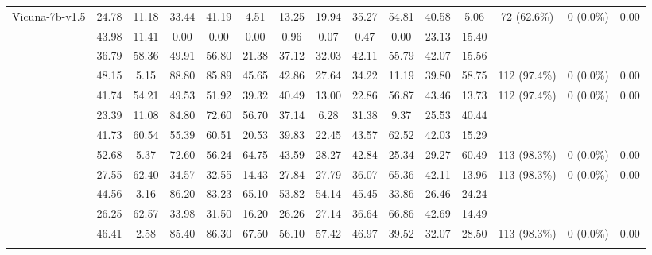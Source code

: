\documentclass[letterpaper]{article} %
\begin{document}
{\begin{table}[t!]
\begin{tabular}{p{2.2cm} ccccccccccc cc c}
\multirow{2}{*}{Vicuna-7b-v1.5} & 24.78 	&	11.18 	&	33.44 	&	41.19 	&	4.51 	&	13.25 	&	19.94 	&	35.27 	&	54.81 	&	40.58 	&	5.06    & \multirow{2}{*}{72 (62.6\%)} & \multirow{2}{*}{0 (0.0\%)} & \multirow{2}{*}{0.00} \\
& 43.98 	&	11.41 	&	0.00 	&	0.00 	&	0.00 	&	0.96 	&	0.07 	&	0.47 	&	0.00 	&	23.13 	&	15.40  &  &  &   \\
\addlinespace[4pt]


\rowcolor{bg-tb-light-nlp} & 36.79 	&	58.36 	&	49.91 	&	56.80 	&	21.38 	&	37.12 	&	32.03 	&	42.11 	&	55.79 	&	42.07 	&	15.56  &  &  &  \\
\rowcolor{bg-tb-light-nlp} \multirow{-2}{*}{Falcon3-7B-Instruct} & 48.15 	&	5.15 	&	88.80 	&	85.89 	&	45.65 	&	42.86 	&	27.64 	&	34.22 	&	11.19 	&	39.80 	&	58.75  & \multirow{-2}{*}{112 (97.4\%)} & \multirow{-2}{*}{0 (0.0\%)} & \multirow{-2}{*}{0.00} \\
\addlinespace[4pt]


\multirow{2}{*}{\parbox{2cm}{Ministral-8B-Instruct-2410}} & 41.74 	&	54.21 	&	49.53 	&	51.92 	&	39.32 	&	40.49 	&	13.00 	&	22.86 	&	56.87 	&	43.46 	&	13.73  &\multirow{2}{*}{112 (97.4\%)} & \multirow{2}{*}{0 (0.0\%)} & \multirow{2}{*}{0.00} \\
& 23.39 	&	11.08 	&	84.80 	&	72.60 	&	56.70 	&	37.14 	&	6.28 	&	31.38 	&	9.37 	&	25.53 	&	40.44  &  &  &  \\
\addlinespace[4pt]


\rowcolor{bg-tb-light-nlp} & 41.73 	&	60.54 	&	55.39 	&	60.51 	&	20.53 	&	39.83 	&	22.45 	&	43.57 	&	62.52 	&	42.03 	&	15.29  &   &  &  \\
\rowcolor{bg-tb-light-nlp} \multirow{-2}{*}{Yi-Lightning} & 52.68 	&	5.37 	&	72.60 	&	56.24 	&	64.75 	&	43.59 	&	28.27 	&	42.84 	&	25.34 	&	29.27 	&	60.49  &\multirow{-2}{*}{113 (98.3\%)} & \multirow{-2}{*}{0 (0.0\%)} & \multirow{-2}{*}{0.00}  \\
\addlinespace[4pt]


\hline


\multirow{2}{*}{GPT-4V} & 27.55 	&	62.40 	&	34.57 	&	32.55 	&	14.43 	&	27.84 	&	27.79 	&	36.07 	&	65.36 	&	42.11 	&	13.96  & \multirow{2}{*}{113 (98.3\%)} & \multirow{2}{*}{0 (0.0\%)} & \multirow{2}{*}{0.00} \\
& 44.56 	&	3.16 	&	86.20 	&	83.23 	&	65.10 	&	53.82 	&	54.14 	&	45.45 	&	33.86 	&	26.46 	&	24.24  &  &  &  \\
\addlinespace[4pt]

\rowcolor{bg-tb-light-nlp} & 26.25 	&	62.57 	&	33.98 	&	31.50 	&	16.20 	&	26.26 	&	27.14 	&	36.64 	&	66.86 	&	42.69 	&	14.49  & &  &   \\
\rowcolor{bg-tb-light-nlp} \multirow{-2}{*}{GPT-4o}  & 46.41 	&	2.58 	&	85.40 	&	86.30 	&	67.50 	&	56.10 	&	57.42 	&	46.97 	&	39.52 	&	32.07 	&	28.50  &  \multirow{-2}{*}{113 (98.3\%)} & \multirow{-2}{*}{0 (0.0\%)} & \multirow{-2}{*}{0.00} \\
\addlinespace[4pt]



\end{tabular}
\end{table}}
\end{document}
